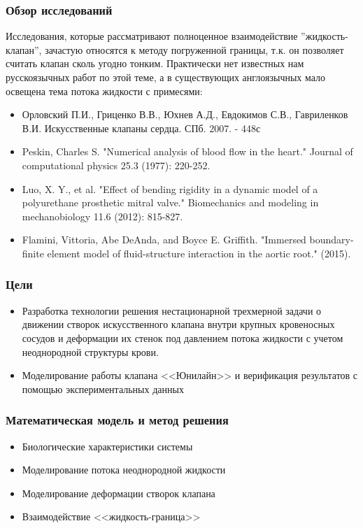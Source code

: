 \documentclass[14pt]{beamer}
\begin{document}
\begin{frame}
\frametitle{Обзор исследований}
    Исследования, которые рассматривают полноценное взаимодействие ''жидкость-клапан'', зачастую относятся
    к методу погруженной границы, т.к. он позволяет считать клапан сколь угодно тонким. Практически нет
    известных нам русскоязычных работ по этой теме, а в существующих англоязычных мало освещена тема потока
    жидкости с примесями:
    \par
    {\tiny
        \begin{itemize}
            \item[\MVRightarrow] Орловский П.И., Гриценко В.В., Юхнев А.Д., Евдокимов С.В., Гавриленков В.И. Искусственные клапаны сердца. СПб. 2007. - 448с
            \item[\MVRightarrow] Peskin, Charles S. "Numerical analysis of blood flow in the heart." Journal of computational physics 25.3 (1977): 220-252.
            \item[\MVRightarrow] Luo, X. Y., et al. "Effect of bending rigidity in a dynamic model of a polyurethane prosthetic mitral valve." Biomechanics and modeling in mechanobiology 11.6 (2012): 815-827.
            \item[\MVRightarrow] Flamini, Vittoria, Abe DeAnda, and Boyce E. Griffith. "Immersed boundary-finite element model of fluid-structure interaction in the aortic root." (2015).
        \end{itemize}
    }
\end{frame}

\begin{frame}
\frametitle{Цели}
    \begin{itemize}
        \item[\MVRightarrow] Разработка технологии решения нестационарной трехмерной задачи о движении створок искусственного клапана внутри крупных кровеносных сосудов и деформации их стенок под давлением потока жидкости с учетом неоднородной структуры крови.
        \item[\MVRightarrow] Моделирование работы клапана <<Юнилайн>> и верификация результатов с помощью экспериментальных данных
    \end{itemize}
\end{frame}

\begin{frame}
\frametitle{Математическая модель и метод решения}
    \begin{itemize}
        \item[\MVRightarrow] Биологические характеристики системы
        \item[\MVRightarrow] Моделирование потока неоднородной жидкости
        \item[\MVRightarrow] Моделирование деформации створок клапана
        \item[\MVRightarrow] Взаимодействие <<жидкость-граница>>
    \end{itemize}
\end{frame}
\end{document}
